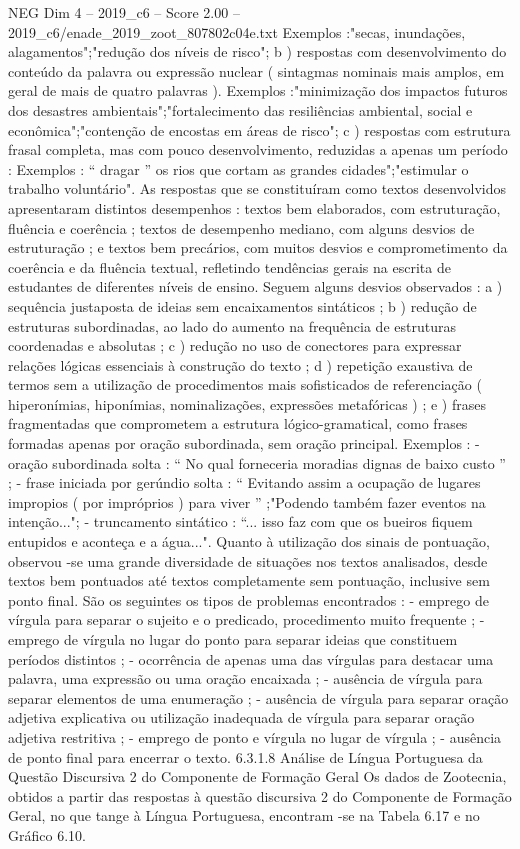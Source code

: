 \begin{textsample}{NEG Dim 4 – 2019\_c6 – Score 2.00 – 2019\_c6/enade\_2019\_zoot\_807802c04e.txt}
Exemplos :"secas, inundações, alagamentos";"redução dos níveis de risco"; b ) respostas com desenvolvimento do conteúdo da palavra ou expressão nuclear ( sintagmas nominais mais amplos, em geral de mais de quatro palavras ).
Exemplos :"minimização dos impactos futuros dos desastres ambientais";"fortalecimento das resiliências ambiental, social e econômica";"contenção de encostas em áreas de risco"; c ) respostas com estrutura frasal completa, mas com pouco desenvolvimento, reduzidas a apenas um período : Exemplos : “ dragar ” os rios que cortam as grandes cidades";"estimular o trabalho voluntário".
As respostas que se constituíram como textos desenvolvidos apresentaram distintos desempenhos : textos bem elaborados, com estruturação, fluência e coerência ; textos de desempenho mediano, com alguns desvios de estruturação ; e textos bem precários, com muitos desvios e comprometimento da coerência e da fluência textual, refletindo tendências gerais na escrita de estudantes de diferentes níveis de ensino.
Seguem alguns desvios observados : a ) sequência justaposta de ideias sem encaixamentos sintáticos ; b ) redução de estruturas subordinadas, ao lado do aumento na frequência de estruturas coordenadas e absolutas ; c ) redução no uso de conectores para expressar relações lógicas essenciais à construção do texto ; d ) repetição exaustiva de termos sem a utilização de procedimentos mais sofisticados de referenciação ( hiperonímias, hiponímias, nominalizações, expressões metafóricas ) ; e ) frases fragmentadas que comprometem a estrutura lógico-gramatical, como frases formadas apenas por oração subordinada, sem oração principal.
Exemplos : - oração subordinada solta : “ No qual forneceria moradias dignas de baixo custo ” ; - frase iniciada por gerúndio solta : “ Evitando assim a ocupação de lugares impropios ( por impróprios ) para viver ” ;"Podendo também fazer eventos na intenção..."; - truncamento sintático : “... isso faz com que os bueiros fiquem entupidos e aconteça e a água...".
Quanto à utilização dos sinais de pontuação, observou -se uma grande diversidade de situações nos textos analisados, desde textos bem pontuados até textos completamente sem pontuação, inclusive sem ponto final.
São os seguintes os tipos de problemas encontrados : - emprego de vírgula para separar o sujeito e o predicado, procedimento muito frequente ; - emprego de vírgula no lugar do ponto para separar ideias que constituem períodos distintos ; - ocorrência de apenas uma das vírgulas para destacar uma palavra, uma expressão ou uma oração encaixada ; - ausência de vírgula para separar elementos de uma enumeração ; - ausência de vírgula para separar oração adjetiva explicativa ou utilização inadequada de vírgula para separar oração adjetiva restritiva ; - emprego de ponto e vírgula no lugar de vírgula ; - ausência de ponto final para encerrar o texto. 6.3.1.8 Análise de Língua Portuguesa da Questão Discursiva 2 do Componente de Formação Geral Os dados de Zootecnia, obtidos a partir das respostas à questão discursiva 2 do Componente de Formação Geral, no que tange à Língua Portuguesa, encontram -se na Tabela 6.17 e no Gráfico 6.10.

\end{textsample}
